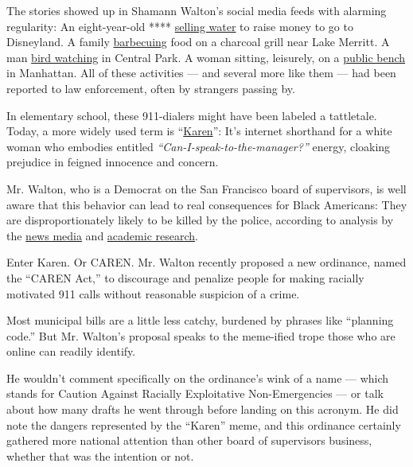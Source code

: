 The stories showed up in Shamann Walton's social media feeds with
alarming regularity: An eight-year-old ****
\href{https://www.theguardian.com/us-news/2018/jun/25/permit-patty-eight-year-old-selling-water-san-francisco-video}{selling
water} to raise money to go to Disneyland. A family
\href{https://www.newsweek.com/lake-merritt-bbq-barbecue-video-oakland-racist-charcoal-east-bay-black-family-919355}{barbecuing}
food on a charcoal grill near Lake Merritt. A man
\href{https://www.nytimes3xbfgragh.onion/2020/06/14/nyregion/central-park-amy-cooper-christian-racism.html}{bird
watching} in Central Park. A woman sitting, leisurely, on a
\href{https://ny.eater.com/2020/6/2/21278346/french-restaurant-maison-vivienne-under-fire-calls-to-police}{public
bench} in Manhattan. All of these activities --- and several more like
them --- had been reported to law enforcement, often by strangers
passing by.

In elementary school, these 911-dialers might have been labeled a
tattletale. Today, a more widely used term is
``\href{https://theconversation.com/how-karen-went-from-a-popular-baby-name-to-a-stand-in-for-white-entitlement-139644}{Karen}'':
It's internet shorthand for a white woman who embodies entitled
\emph{``Can-I-speak-to-the-manager?''} energy, cloaking prejudice in
feigned innocence and concern.

Mr. Walton, who is a Democrat on the San Francisco board of supervisors,
is well aware that this behavior can lead to real consequences for Black
Americans: They are disproportionately likely to be killed by the
police, according to analysis by the
\href{https://www.washingtonpost.com/graphics/investigations/police-shootings-database/}{news
media} and
\href{https://www.nature.com/articles/d41586-019-02601-9}{academic
research}.

Enter Karen. Or CAREN. Mr. Walton recently proposed a new ordinance,
named the ``CAREN Act,'' to discourage and penalize people for making
racially motivated 911 calls without reasonable suspicion of a crime.

Most municipal bills are a little less catchy, burdened by phrases like
``planning code.'' But Mr. Walton's proposal speaks to the meme-ified
trope those who are online can readily identify.

He wouldn't comment specifically on the ordinance's wink of a name ---
which stands for Caution Against Racially Exploitative Non-Emergencies
--- or talk about how many drafts he went through before landing on this
acronym. He did note the dangers represented by the ``Karen'' meme, and
this ordinance certainly gathered more national attention than other
board of supervisors business, whether that was the intention or not.

